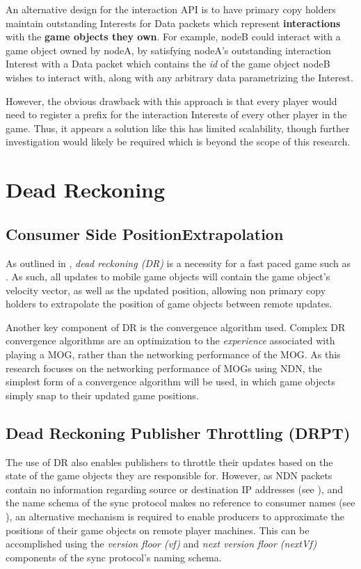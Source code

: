 An alternative design for the interaction API is to have primary copy holders maintain outstanding Interests for Data packets which represent \textbf{interactions} with the \textbf{game objects they own}. For example, nodeB could interact with a game object owned by nodeA, by satisfying nodeA's outstanding interaction Interest with a Data packet which contains the \textit{id} of the game object nodeB wishes to interact with, along with any arbitrary data parametrizing the Interest. 

However, the obvious drawback with this approach is that every player would need to register a prefix for the interaction Interests of every other player in the game. Thus, it appears a solution like this has limited scalability, though further investigation would likely be required which is beyond the scope of this research. 



\section{Dead Reckoning}\label{sec:des:dr}
\subsection{Consumer Side PositionExtrapolation}
As outlined in , \textit{dead reckoning (DR)} is a necessity for a fast paced game such as \game{}. As such, all updates to mobile game objects will contain the game object's velocity vector, as well as the updated position, allowing non primary copy holders to extrapolate the position of game objects between remote updates.

Another key component of DR is the convergence algorithm used. Complex DR convergence algorithms are an optimization to the \textit{experience} associated with playing a MOG, rather than the networking performance of the MOG. As this research focuses on the networking performance of MOGs using NDN, the simplest form of a convergence algorithm will be used, in which game objects simply snap to their updated game positions.

\subsection{Dead Reckoning Publisher Throttling (DRPT)}
The use of DR also enables publishers to throttle their updates based on the state of the game objects they are responsible for. However, as NDN packets contain no information regarding source or destination IP addresses (see ), and the name schema of the sync protocol makes no reference to consumer names (see ), an alternative mechanism is required to enable producers to approximate the positions of their game objects on remote player machines. This can be accomplished using the \textit{version floor (vf)} and \textit{next version floor (nextVf)} components of the sync protocol's naming schema.


